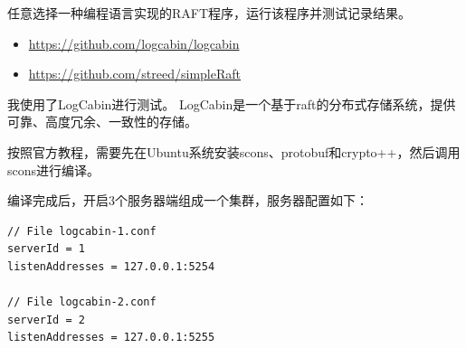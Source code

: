 \documentclass[logo,reportComp]{thesis}
\begin{document}
\begin{question}
任意选择一种编程语言实现的RAFT程序，运行该程序并测试记录结果。
\begin{itemize}
	\item \url{https://github.com/logcabin/logcabin}
	\item \url{https://github.com/streed/simpleRaft}
\end{itemize}
\end{question}
\begin{answer}
我使用了LogCabin进行测试。
LogCabin是一个基于raft的分布式存储系统，提供可靠、高度冗余、一致性的存储。

按照官方教程，需要先在Ubuntu系统安装scons、protobuf和crypto++，然后调用scons进行编译。

编译完成后，开启3个服务器端组成一个集群，服务器配置如下：
\begin{lstlisting}
// File logcabin-1.conf
serverId = 1
listenAddresses = 127.0.0.1:5254

// File logcabin-2.conf
serverId = 2
listenAddresses = 127.0.0.1:5255


\end{lstlisting}
\end{answer}
\end{document}
